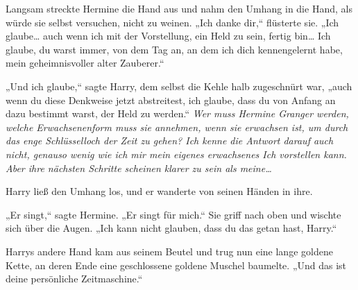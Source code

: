Langsam streckte Hermine die Hand aus und nahm den Umhang in die Hand, als würde sie selbst versuchen, nicht zu weinen.
„Ich danke dir,“ flüsterte sie. „Ich glaube… auch wenn ich mit der Vorstellung, ein Held zu sein, fertig bin… Ich glaube, du warst immer, von dem Tag an, an dem ich dich kennengelernt habe, mein geheimnisvoller alter Zauberer.“

„Und ich glaube,“ sagte Harry, dem selbst die Kehle halb zugeschnürt war, „auch wenn du diese Denkweise jetzt abstreitest, ich glaube, dass du von Anfang an dazu bestimmt warst, der Held zu werden.“
\emph{Wer muss Hermine Granger werden, welche Erwachsenenform muss sie annehmen, wenn sie erwachsen ist, um durch das enge Schlüsselloch der Zeit zu gehen? Ich kenne die Antwort darauf auch nicht, genauso wenig wie ich mir mein eigenes erwachsenes Ich vorstellen kann. Aber ihre nächsten Schritte scheinen klarer zu sein als meine…}

Harry ließ den Umhang los, und er wanderte von seinen Händen in ihre.

„Er singt,“ sagte Hermine. „Er singt für mich.“ Sie griff nach oben und wischte sich über die Augen. „Ich kann nicht glauben, dass du das getan hast, Harry.“

Harrys andere Hand kam aus seinem Beutel und trug nun eine lange goldene Kette, an deren Ende eine geschlossene goldene Muschel baumelte.
„Und das ist deine persönliche Zeitmaschine.“

